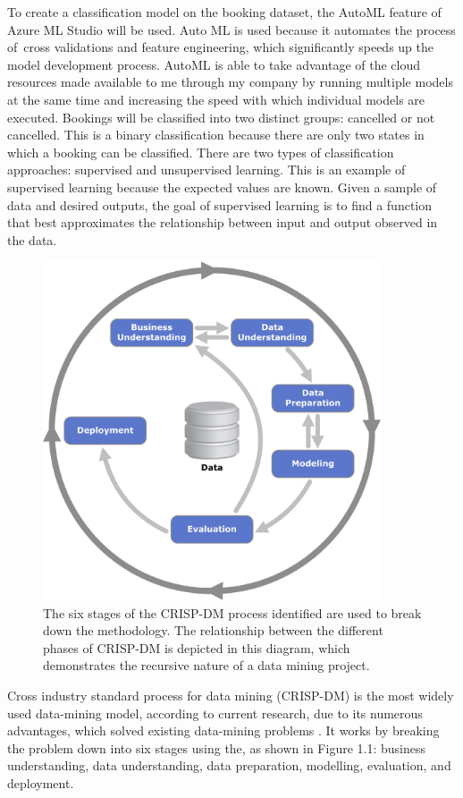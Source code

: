 To create a classification model on the booking dataset, the AutoML feature of Azure ML Studio will be used. Auto ML is used because it automates the process of cross validations and feature engineering, which significantly speeds up the model development process. AutoML is able to take advantage of the cloud resources made available to me through my company by running multiple models at the same time and increasing the speed with which individual models are executed. Bookings will be classified into two distinct groups: cancelled or not cancelled. This is a binary classification because there are only two states in which a booking can be classified. There are two types of classification approaches: supervised and unsupervised learning. This is an example of supervised learning because the expected values are known. Given a sample of data and desired outputs, the goal of supervised learning is to find a function that best approximates the relationship between input and output observed in the data.

 \begin{figure}[H]
 \centering
 \includegraphics[width=10cm]{figures/CRISPDM_Process_Diagram.png}
 \caption{The six stages of the CRISP-DM process identified are used to break down the methodology. The relationship between the different phases of CRISP-DM is depicted in this diagram, which demonstrates the recursive nature of a data mining project.}
\end{figure} 


Cross industry standard process for data mining (CRISP-DM) is the most widely used data-mining model, according to current research, due to its numerous advantages, which solved existing data-mining problems \cite{Wirth2000CRISP-DMMining}. It works by breaking the problem down into six stages using the, as shown in Figure 1.1: business understanding, data understanding, data preparation, modelling, evaluation, and deployment.

